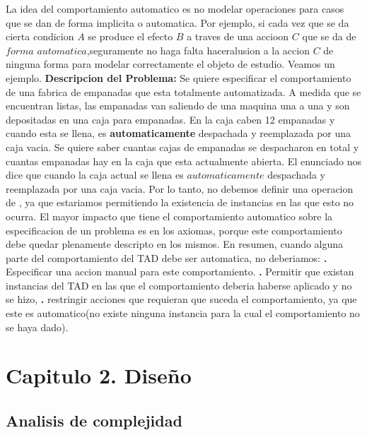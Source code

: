\documentclass[10pt,a4paper]{article}
\begin{document}
La idea del comportamiento automatico es no modelar operaciones para casos que se dan de forma implicita o automatica. Por ejemplo, si cada vez que se da cierta condicion $A$ se produce el efecto $B$ a traves de una accioon $C$ que se da de $forma$ $automatica$,seguramente no haga falta haceralusion a la accion $C$ de ninguna forma para modelar correctamente el objeto de estudio. Veamos un ejemplo.
\newline
\newline \textbf{Descripcion del Problema:} Se quiere especificar el comportamiento de una fabrica de empanadas que esta totalmente automatizada. A medida que se encuentran listas, las empanadas van saliendo de una maquina una a una y son depositadas en una caja para empanadas. En la caja caben 12 empanadas y cuando esta se llena, es \textbf{automaticamente} despachada y reemplazada por una caja vacia. Se quiere saber cuantas cajas de empanadas se despacharon en total y cuantas empanadas hay en la caja que esta actualmente abierta. El enunciado nos dice que cuando la caja actual se llena es $automaticamente$ despachada y reemplazada por una caja vacia. Por lo tanto, no debemos definir una operacion de , ya que estariamos permitiendo la existencia de instancias en las que esto no ocurra. El mayor impacto que tiene el comportamiento automatico sobre la especificacion de un problema es en los axiomas, porque este comportamiento debe quedar plenamente descripto en los mismos. En resumen, cuando alguna parte del comportamiento del TAD debe ser automatica, no deberiamos:
\newline
\newline
\textbf{.} Especificar una accion manual para este comportamiento.
\newline
\newline
\textbf{.} Permitir que existan instancias del TAD en las que el comportamiento deberia haberse aplicado y no se hizo,
\newline
\newline
\textbf{.} restringir acciones que requieran que suceda el comportamiento, ya que este es automatico(no existe ninguna instancia para la cual el comportamiento no se haya dado).
\newpage

\section{Capitulo 2. Diseño}

\subsection{Analisis de complejidad}
\end{document}
